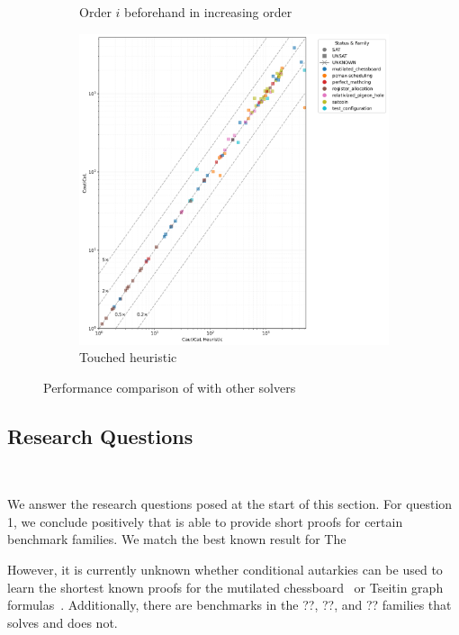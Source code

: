 \begin{figure}[!t]
\begin{subfigure}[t]{0.3\textwidth}
        \caption{Order $i$ beforehand in increasing order}
        \label{fig:cautical-vs-prelearn}
    \end{subfigure}
    \begin{subfigure}[t]{0.3\textwidth}
        \centering
        \includegraphics[width=\textwidth]{figs/globaltouch_heuristic_comparison.jpg}
        \caption{Touched heuristic}
        \label{fig:cautical-vs-prelearn}
    \end{subfigure}

    \caption{Performance comparison of \tool with other solvers}
    \label{fig:solver-comparison}
\end{figure}


\subsection{Research Questions}~\label{subsec:eval-research-questions}

We answer the research questions posed at the start of this section. For
question 1, we conclude positively that \tool is able to provide short \pr
proofs for certain benchmark families. We match the best known result for The

However, it is currently unknown whether conditional autarkies can be used to
learn the shortest known \pr proofs for the mutilated
chessboard~\cite{mutilatedchessboard-pr} or Tseitin graph
formulas~\cite{sadical}. Additionally, there are benchmarks in the ??, ??, and
?? families that \prelearn solves and \tool does not.

